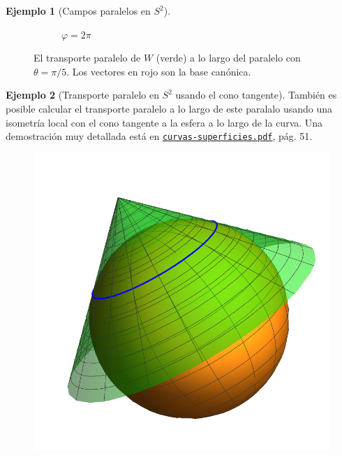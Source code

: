 \documentclass[spanish]{book}
\theoremstyle{definition}
\newtheorem*{ejem}{Ejemplo}
\begin{document}
\begin{ejem}[Campos paralelos en $S^2$]
\begin{figure}[H]
\begin{center}
\begin{subfigure}[t]{0.4\linewidth}
					\caption*{$\varphi=2\pi$}
				\end{subfigure}
			\end{center}
			\caption*{El transporte paralelo de $W$ (verde) a lo largo del paralelo con $\theta=\pi/5$. Los vectores en rojo son la base canónica.}
		\end{figure}
	\end{ejem}
	
	\begin{ejem}[Transporte paralelo en $S^2$ usando el cono tangente]
		También es posible calcular el transporte paralelo a lo largo de este paralalo usando una isometría local con el cono tangente a la esfera a lo largo de la curva. Una demostración muy detallada está en \href{https://github.com/dan-gc/curvas-superficies/blob/main/curvas-superficies.pdf}{\texttt{curvas-superficies.pdf}}, pág. 51.
		\begin{figure}[H]
			\begin{center}
				\centering
				\includegraphics[width=0.5\linewidth]{fig16}
			\end{center}
		\end{figure}
	\end{ejem}
	
\end{document}
